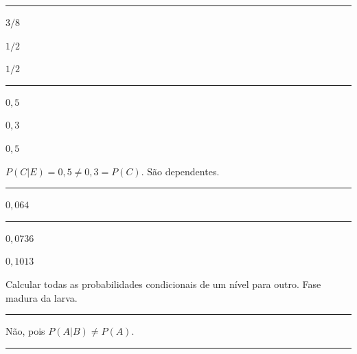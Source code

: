 \documentclass[a4paper,11pt,fleqn]{article}\usepackage[]{graphicx}\usepackage[]{color}
\theoremstyle{definition}
\begin{document}
\begin{compactenum}
\vspace{0.3cm}
\hrule
\vspace{0.3cm}

\item
  \begin{inparaenum}
  \item $3/8$
  \item $1/2$
  \item $1/2$
  \end{inparaenum}

\vspace{0.3cm}
\hrule
\vspace{0.3cm}

\item
  \begin{inparaenum}
  \item
  \item $0,5$
  \item $0,3$
  \item $0,5$
  \item $P(C|E) = 0,5 \neq 0,3 = P(C)$. São dependentes.
  \end{inparaenum}

\vspace{0.3cm}
\hrule
\vspace{0.3cm}

\item $0,064$

\vspace{0.3cm}
\hrule
\vspace{0.3cm}

\item
  \begin{compactenum}
  \item $0,0736$
  \item $0,1013$
  \item Calcular todas as probabilidades condicionais de um nível para
    outro. Fase madura da larva.
  \end{compactenum}

\vspace{0.3cm}
\hrule
\vspace{0.3cm}

\item Não, pois $P(A|B) \neq P(A)$.

\vspace{0.3cm}
\hrule
\vspace{0.3cm}


\end{compactenum}
\end{document}
